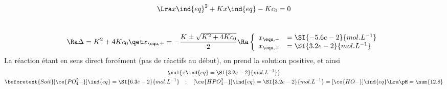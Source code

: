\documentclass[a4paper, 10pt, final, garamond]{book}
\begin{document}
{\begin{minipage}[c]{.69\linewidth}
\begin{gather*}
			\Lra
			x\ind{eq}^2 + K x\ind{eq} - K c_0 = 0
		\end{gather*}
	\end{minipage}
	\vspace{-15pt}
	\begin{gather*}
		\\\Ra
		\Delta = K^2 + 4Kc_0
		\qet
		x_{\equ,\pm} = - \frac{K \pm \sqrt{K^2+4Kc_0}}{2}
		\Ra
		\left\{
		\begin{array}{ll}
			x_{\equ,-} & = \SI{-5.6e-2}{mol.L^{-1}}
			\\
			x_{\equ,+} & = \SI{3.2e-2}{mol.L^{-1}}
		\end{array}
		\right.
	\end{gather*}
	La réaction étant en sens direct forcément (pas de réactifs au début), on
	prend la solution positive, et ainsi
	\begin{gather*}
		\xul{x\ind{eq} = \SI{3.2e-2}{mol.L^{-1}}}
		\\
		\beforetext{Soit}
		[\ce{PO_4^2-}]\ind{eq} = \SI{6.3e-2}{mol.L^{-1}}
		\quad ; \quad
		[\ce{HPO_4^2-}]\ind{eq} = \SI{3.2e-2}{mol.L^{-1}} = [\ce{HO-}]\ind{eq}
		\Lra \pH = \num{12.8}
	\end{gather*}
}

\resetQ
\end{document}
